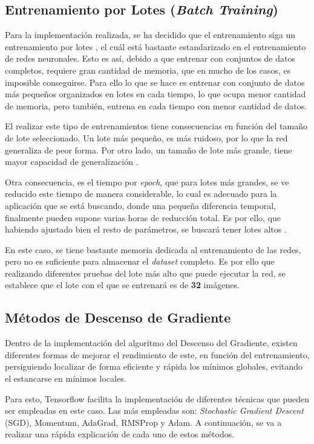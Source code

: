 \subsection{Entrenamiento por Lotes (\textit{Batch Training})}

Para la implementación realizada, se ha decidido que el entrenamiento siga un entrenamiento por lotes \cite{batch_training_edward}, el cuál está bastante estandarizado en el entrenamiento de redes neuronales. Esto es así, debido a que entrenar con conjuntos de datos completos, requiere gran cantidad de memoria, que en mucho de los casos, es imposible conseguirse. Para ello lo que se hace es entrenar con conjunto de datos más pequeños organizados en lotes en cada tiempo, lo que ocupa menor cantidad de memoria, pero también, entrena en cada tiempo con menor cantidad de datos.

El realizar este tipo de entrenamientos tiene consecuencias en función del tamaño de lote seleccionado. Un lote más pequeño, es más ruidoso, por lo que la red generaliza de peor forma. Por otro lado, un tamaño de lote más grande, tiene mayor capacidad de generalización \cite{brownlee_how_2019}.

Otra consecuencia, es el tiempo por \textit{epoch}, que para lotes más grandes, se ve reducido este tiempo de manera considerable, lo cual es adecuado para la aplicación que se está buscando, donde una pequeña diferencia temporal, finalmente pueden supone varias horas de reducción total. Es por ello, que habiendo ajustado bien el resto de parámetros, se buscará tener lotes altos \cite{chang_effect_2020}.

En este caso, se tiene bastante memoria dedicada al entrenamiento de las redes, pero no es suficiente para almacenar el \textit{dataset} completo. Es por ello que realizando diferentes pruebas del lote más alto que puede ejecutar la red, se establece que el lote con el que se entrenará es de \textbf{32} imágenes.

\subsection{Métodos de Descenso de Gradiente}

Dentro de la implementación del algoritmo del Descenso del Gradiente, existen diferentes formas de mejorar el rendimiento de este, en función del entrenamiento, persiguiendo localizar de forma eficiente y rápida los mínimos globales, evitando el estancarse en mínimos locales.

Para esto, Tensorflow facilita la implementación de diferentes técnicas que pueden ser empleadas en este caso. Las más empleadas son: \textit{Stochastic Gradient Descent} (SGD), Momentum, AdaGrad, RMSProp y Adam. A continuación, se va a realizar una rápida explicación de cada uno de estos métodos.

